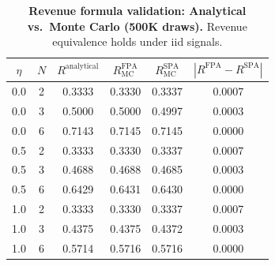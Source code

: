\begin{table}[H]
  \centering
  \small
  \caption[Revenue formula validation: Analytical vs.\ Monte Carlo (500K draws)]{\textbf{Revenue formula validation: Analytical vs.\ Monte Carlo (500K draws).} Revenue equivalence holds under iid signals.}
  \label{tab:bne_revenue_match}
  \begin{tabular}{cccccc}
    \toprule
    $\eta$ & $N$ & $R^{\text{analytical}}$ & $R^{\text{FPA}}_{\text{MC}}$ & $R^{\text{SPA}}_{\text{MC}}$ & $|R^{\text{FPA}} - R^{\text{SPA}}|$ \\
    \midrule
    0.0 & 2 & 0.3333 & 0.3330 & 0.3337 & 0.0007 \\
    0.0 & 3 & 0.5000 & 0.5000 & 0.4997 & 0.0003 \\
    0.0 & 6 & 0.7143 & 0.7145 & 0.7145 & 0.0000 \\
    0.5 & 2 & 0.3333 & 0.3330 & 0.3337 & 0.0007 \\
    0.5 & 3 & 0.4688 & 0.4688 & 0.4685 & 0.0003 \\
    0.5 & 6 & 0.6429 & 0.6431 & 0.6430 & 0.0000 \\
    1.0 & 2 & 0.3333 & 0.3330 & 0.3337 & 0.0007 \\
    1.0 & 3 & 0.4375 & 0.4375 & 0.4372 & 0.0003 \\
    1.0 & 6 & 0.5714 & 0.5716 & 0.5716 & 0.0000 \\
    \bottomrule
  \end{tabular}
\end{table}